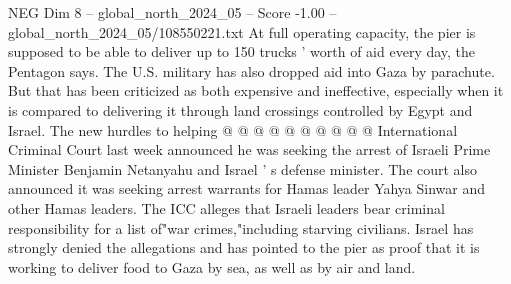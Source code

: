 \begin{textsample}{NEG Dim 8 – global\_north\_2024\_05 – Score -1.00 – global\_north\_2024\_05/108550221.txt}
At full operating capacity, the pier is supposed to be able to deliver up to 150 trucks ' worth of aid every day, the Pentagon says.
The U.S. military has also dropped aid into Gaza by parachute.
But that has been criticized as both expensive and ineffective, especially when it is compared to delivering it through land crossings controlled by Egypt and Israel.
The new hurdles to helping @ @ @ @ @ @ @ @ @ @ International Criminal Court last week announced he was seeking the arrest of Israeli Prime Minister Benjamin Netanyahu and Israel ' s defense minister.
The court also announced it was seeking arrest warrants for Hamas leader Yahya Sinwar and other Hamas leaders.
The ICC alleges that Israeli leaders bear criminal responsibility for a list of"war crimes,"including starving civilians.
Israel has strongly denied the allegations and has pointed to the pier as proof that it is working to deliver food to Gaza by sea, as well as by air and land.

\end{textsample}

